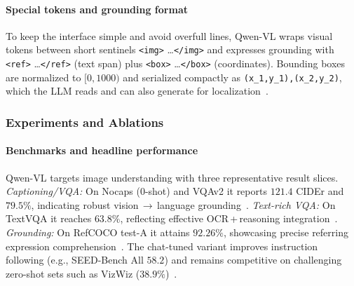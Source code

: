\begin{enrichment}
\begin{enrichment}
        \paragraph{Special tokens and grounding format}
        To keep the interface simple and avoid overfull lines, Qwen\mbox{-}VL wraps visual tokens between short sentinels \verb|<img>| \dots \verb|</img>| and expresses grounding with \verb|<ref>| \dots \verb|</ref>| (text span) plus \verb|<box>| \dots \verb|</box>| (coordinates). Bounding boxes are normalized to $[0,1000)$ and serialized compactly as \verb|(x_1,y_1),(x_2,y_2)|, which the LLM reads and can also generate for localization~\cite{bai2023_qwenvl}.
        
        \subsubsection{Experiments and Ablations}
        \label{subsubsec:chapter24_qwenvl_experiments}
        
        \paragraph{Benchmarks and headline performance}
        Qwen\mbox{-}VL targets image understanding with three representative result slices.\; \emph{Captioning/VQA:} On Nocaps (0\mbox{-}shot) and VQAv2 it reports $121.4$ CIDEr and $79.5\%$, indicating robust vision\,$\to$\,language grounding~\cite[Table~4]{bai2023_qwenvl}. \emph{Text\mbox{-}rich VQA:} On TextVQA it reaches $63.8\%$, reflecting effective OCR\,+\,reasoning integration~\cite[Table~5]{bai2023_qwenvl}. \emph{Grounding:} On RefCOCO test\mbox{-}A it attains $92.26\%$, showcasing precise referring expression comprehension~\cite[Table~6]{bai2023_qwenvl}. The chat\mbox{-}tuned variant improves instruction following (e.g., SEED\mbox{-}Bench All $58.2$) and remains competitive on challenging zero\mbox{-}shot sets such as VizWiz ($38.9\%$)~\cite[Tables~4,7]{bai2023_qwenvl}.
        

\end{enrichment}
\end{enrichment}
